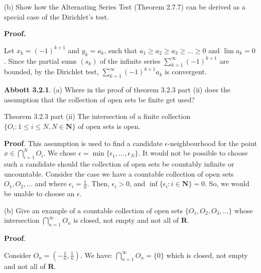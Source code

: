 \documentclass[10pt]{article}
\begin{document}
(b) Show how the Alternating Series Test (Theorem 2.7.7) can be derived as a special case of the Dirichlet's test.



\textbf{Proof.}



Let $\displaystyle x_{k} =( -1)^{k+1}$ and $\displaystyle y_{k} =a_{k}$, such that $\displaystyle a_{1} \geq a_{2} \geq a_{3} \geq \dotsc \geq 0$ and $\displaystyle \lim a_{k} =0$. Since the partial sums $\displaystyle ( s_{k})$ of the infinite series $\displaystyle \sum _{k=1}^{\infty }( -1)^{k+1}$ are bounded, by the Dirichlet test, $\displaystyle \sum _{k=1}^{\infty }( -1)^{k+1} a_{k}$ is convergent.



\textbf{Abbott 3.2.1}. (a) Where in the proof of theorem 3.2.3 part (ii) does the assumption that the collection of open sets be finite get used?



Theorem 3.2.3 part (ii) The intersection of a finite collection $\displaystyle \{O_{i} :1\leq i\leq N,N\in \mathbf{N}\}$ of open sets is open.



\textbf{Proof}. This assumption is used to find a candidate $\displaystyle \epsilon $-neighbourhood for the point $\displaystyle x\in \bigcap _{i=1}^{N} O_{i}$. We chose $\displaystyle \epsilon =\min\{\epsilon _{1} ,\dotsc ,\epsilon _{N}\}$. It would not be possible to choose such a candidate should the collection of open sets be countably infinite or uncountable. Consider the case we have a countable collection of open sets $\displaystyle O_{1} ,O_{2} ,\dotsc $ and where $\displaystyle \epsilon _{i} =\frac{1}{n}$. Then, $\displaystyle \epsilon _{i}  >0$, and $\displaystyle \inf\{\epsilon _{i} :i\in \mathbf{N}\} =0$. So, we would be unable to choose an $\displaystyle \epsilon $.



(b) Give an example of a countable collection of open sets $\displaystyle \{O_{1} ,O_{2} ,O_{3} ,\dotsc \}$ whose intersection $\displaystyle \bigcap _{n=1}^{\infty } O_{n}$ is closed, not empty and not all of $\displaystyle \mathbf{R}$.



\textbf{Proof}.



Consider $\displaystyle O_{n} =\left( -\frac{1}{n} ,\frac{1}{n}\right)$. We have: $\displaystyle \bigcap _{n=1}^{\infty } O_{n} =\{0\}$ which is closed, not empty and not all of $\displaystyle \mathbf{R}$.
\end{document}
